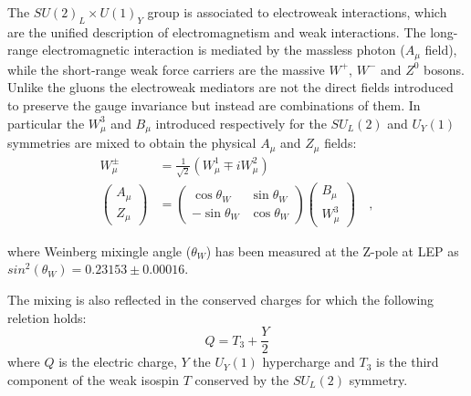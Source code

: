 The $SU(2)_{L} \times U(1)_{Y}$ group is associated to electroweak interactions, which are the
unified description of electromagnetism and weak interactions. The long-range electromagnetic
interaction is mediated by the massless photon ($A_{\mu}$ field), while the short-range weak force carriers are the
massive $W^{+}$, $W^{-}$ and $Z^{0}$ bosons. Unlike the gluons the electroweak mediators
are not the direct fields introduced to preserve the gauge invariance but instead are combinations
of them. In particular the $W_{\mu}^3$ and $B_{\mu}$ introduced respectively for the $SU_L(2)$ and $U_Y(1)$ symmetries
are mixed to obtain the physical $A_{\mu}$ and $Z_{\mu}$ fields:
\[
\begin{split}
  W_{\mu}^{\pm} & = \frac{1}{\sqrt{2}}\left(W_{\mu}^{1}\mp i W_{\mu}^{2}\right) \\
  \left(
  \begin{array}{c}
  A_{\mu} \\ Z_{\mu}
  \end{array}
  \right)
  & =
  \left(
  \begin{array}{cc}
  \cos\theta_{W} & \sin\theta_{W} \\
  -\sin\theta_{W} & \cos\theta_{W}
  \end{array}
  \right)
  \left(
  \begin{array}{c}
  B_{\mu} \\ W_{\mu}^{3}
  \end{array}
  \right) \quad ,
\end{split}
\]

where Weinberg mixingle angle ($\theta_W$) has been measured at the Z-pole at LEP as
$sin^2(\theta_W) = 0.23153 \pm 0.00016$.

The mixing is also reflected in the conserved charges for which the following reletion holds:
\[
  Q = T_3 + \frac{Y}{2}
\]
where $Q$ is the electric charge, $Y$ the $U_Y(1)$ hypercharge and $T_3$ is the third component of the weak
isospin $T$ conserved by the $SU_L(2)$ symmetry.

